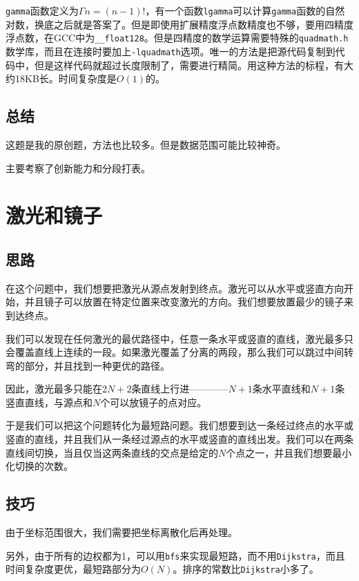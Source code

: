 \documentclass[hyperref,UTF8,12pt,a4paper]{ctexart}
\begin{document}
\verb|gamma|函数定义为$\Gamma n=(n-1)!$，有一个函数\verb|lgamma|可以计算\verb|gamma|函数的自然对数，换底之后就是答案了。但是即使用扩展精度浮点数精度也不够，要用四精度浮点数，在GCC中为\verb|__float128|。但是四精度的数学运算需要特殊的\verb|quadmath.h|数学库，而且在连接时要加上\verb|-lquadmath|选项。唯一的方法是把源代码复制到代码中，但是这样代码就超过长度限制了，需要进行精简。用这种方法的标程，有大约18KB长。时间复杂度是$O(1)$的。

\subsection{总结}

这题是我的原创题，方法也比较多。但是数据范围可能比较神奇。

主要考察了创新能力和分段打表。

\section{激光和镜子}

\subsection{思路}

在这个问题中，我们想要把激光从源点发射到终点。激光可以从水平或竖直方向开始，并且镜子可以放置在特定位置来改变激光的方向。我们想要放置最少的镜子来到达终点。

我们可以发现在任何激光的最优路径中，任意一条水平或竖直的直线，激光最多只会覆盖直线上连续的一段。如果激光覆盖了分离的两段，那么我们可以跳过中间转弯的部分，并且找到一种更优的路径。

因此，激光最多只能在$2N+2$条直线上行进————$N+1$条水平直线和$N+1$条竖直直线，与源点和$N$个可以放镜子的点对应。

于是我们可以把这个问题转化为最短路问题。我们想要到达一条经过终点的水平或竖直的直线，并且我们从一条经过源点的水平或竖直的直线出发。我们可以在两条直线间切换，当且仅当这两条直线的交点是给定的$N$个点之一，并且我们想要最小化切换的次数。

\subsection{技巧}

由于坐标范围很大，我们需要把坐标离散化后再处理。

另外，由于所有的边权都为1，可以用\verb|bfs|来实现最短路，而不用\verb|Dijkstra|，而且时间复杂度更优，最短路部分为$O(N)$。排序的常数比\verb|Dijkstra|小多了。
\end{document}
